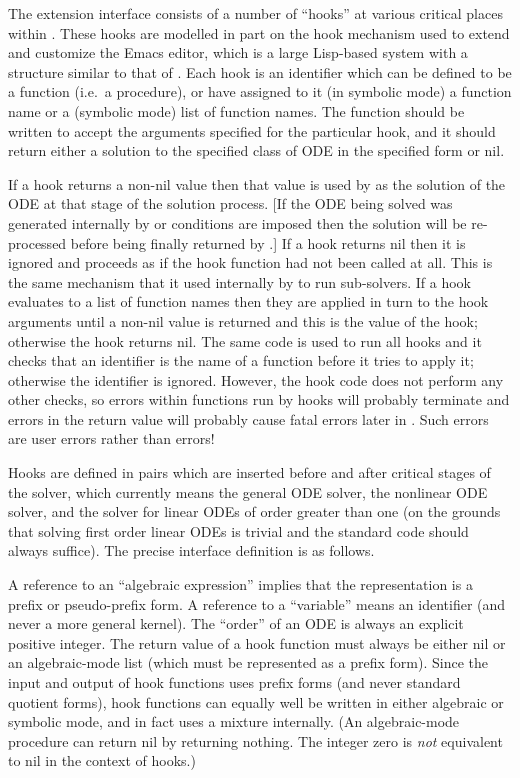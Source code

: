 The extension interface consists of a number of ``hooks'' at various
critical places within .  These hooks are modelled in
part on the hook mechanism used to extend and customize the Emacs
editor, which is a large Lisp-based system with a structure similar to
that of \REDUCE\@.  Each  hook is an identifier which can
be defined to be a function (i.e.\ a procedure), or have assigned to
it (in symbolic mode) a function name or a (symbolic mode) list of
function names.  The function should be written to accept the
arguments specified for the particular hook, and it should return
either a solution to the specified class of ODE in the specified form
or nil.

If a hook returns a non-nil value then that value is used by
 as the solution of the ODE at that stage of the solution
process.  [If the ODE being solved was generated internally by
 or conditions are imposed then the solution will be
re-processed before being finally returned by .]  If a
hook returns nil then it is ignored and  proceeds as if
the hook function had not been called at all.  This is the same
mechanism that it used internally by  to run sub-solvers.
If a hook evaluates to a list of function names then they are applied
in turn to the hook arguments until a non-nil value is returned and
this is the value of the hook; otherwise the hook returns nil.  The
same code is used to run all hooks and it checks that an identifier is
the name of a function before it tries to apply it; otherwise the
identifier is ignored.  However, the hook code does not perform any
other checks, so errors within functions run by hooks will probably
terminate  and errors in the return value will probably
cause fatal errors later in .  Such errors are user
errors rather than  errors!

Hooks are defined in pairs which are inserted before and after
critical stages of the solver, which currently means the general ODE
solver, the nonlinear ODE solver, and the solver for linear ODEs of
order greater than one (on the grounds that solving first order linear
ODEs is trivial and the standard  code should always
suffice).  The precise interface definition is as follows.

A reference to an ``algebraic expression'' implies that the \REDUCE{}
representation is a prefix or pseudo-prefix form.  A reference to a
``variable'' means an identifier (and never a more general kernel).
The ``order'' of an ODE is always an explicit positive integer.  The
return value of a hook function must always be either nil or an
algebraic-mode list (which must be represented as a prefix form).
Since the input and output of hook functions uses prefix forms (and
never standard quotient forms), hook functions can equally well be
written in either algebraic or symbolic mode, and in fact 
uses a mixture internally.  (An algebraic-mode procedure can return
nil by returning nothing.  The integer zero is \emph{not} equivalent
to nil in the context of  hooks.)

